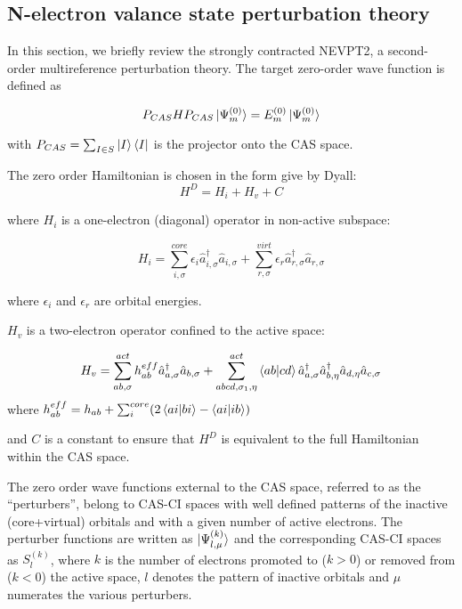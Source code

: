 \subsection{N-electron valance state perturbation theory} 

In this section, we briefly review the strongly contracted NEVPT2, a second-order multireference perturbation theory. The target zero-order wave function is defined as 

\begin{equation}
P_{CAS}HP_{CAS} \ket{\Psi^{(0)}_m} = E^{(0)}_m \ket{\Psi^{(0)}_m}
\end{equation}

with $P_{CAS} = \sum_{I\in S}\ket{I}\bra{I}$ is the projector onto the CAS space. 

The zero order Hamiltonian is chosen in the form give by Dyall:
\begin{equation}
  H^D = H_i + H_v + C
\end{equation}

where $H_i$ is a one-electron (diagonal) operator in non-active subspace:

\begin{equation}
  H_i = \sum_{i,\sigma}^{core} \epsilon_i \hat{a}^\dagger_{i,\sigma}\hat{a}_{i,\sigma} + \sum_{r,\sigma}^{virt} \epsilon_r \hat{a}^\dagger_{r,\sigma}\hat{a}_{r,\sigma}
\end{equation}

where $\epsilon_i $ and $\epsilon_r$ are orbital energies.

$H_v$ is a two-electron operator confined to the active space:

\begin{equation}
  H_v = \sum_{ab,\sigma}^{act} h^{eff}_{ab} \hat{a}^\dagger_{a,\sigma} \hat{a}_{b,\sigma} + \sum_{abcd,\sigma_1,\eta}^{act} \braket{ab|cd} \hat{a}^\dagger_{a,\sigma}\hat{a}^\dagger_{b,\eta}\hat{a}_{d,\eta}\hat{a}_{c,\sigma}
\end{equation}
where $h_{ab}^{eff} = h_{ab} + \sum_{i}^{core} (2\braket{ai|bi}-\braket{ai|ib})$

and $C$ is a constant to ensure that $H^D$ is equivalent to the full Hamiltonian within the CAS space.

The zero order wave functions external to the CAS space, referred to as the ``perturbers'', belong to CAS-CI spaces with well defined patterns of the inactive (core+virtual) orbitals and with a given number of active electrons. The perturber functions are written  as $\ket{\Psi^{(k)}_{l,\mu}}$ and the corresponding CAS-CI spaces as $S_l^{(k)}$, where $k$ is the number of electrons promoted to ($k>0$) or removed from ($k<0$) the active space, $l$ denotes the pattern of inactive orbitals and $\mu$ numerates the various perturbers. 

